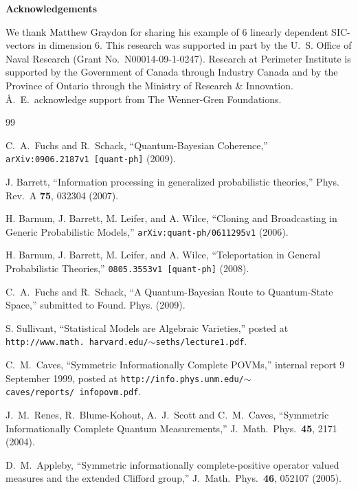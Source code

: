 \documentclass[letterpaper,11pt]{article}
\begin{document}
\begin{center}
 \textbf{Acknowledgements}
\end{center}

We thank Matthew Graydon for sharing his example of 6 linearly dependent SIC-vectors in dimension 6. This research was supported in part by the U.~S. Office of Naval Research (Grant No.~N00014-09-1-0247). Research at Perimeter Institute is supported by the Government of Canada through Industry Canada and by the Province of Ontario through the Ministry of Research \& Innovation. \AA.~E.~acknowledge support from The Wenner-Gren Foundations.



\vspace{12pt}
\begin{thebibliography}{99}
\itemsep -1pt
\small

C.~A.~Fuchs and R.~Schack, ``Quantum-Bayesian Coherence,''  {\tt arXiv:0906.2187v1 [quant-ph]} (2009).

J. Barrett, ``Information processing in generalized probabilistic theories,''
Phys. Rev.~A {\bf 75}, 032304 (2007).

H. Barnum, J. Barrett, M. Leifer, and A. Wilce, ``Cloning and Broadcasting in Generic Probabilistic Models,'' {\tt 	 arXiv:quant-ph/0611295v1} (2006).

H. Barnum, J. Barrett, M. Leifer, and A. Wilce, ``Teleportation in General Probabilistic Theories,''
{\tt 0805.3553v1 [quant-ph]} (2008).

C.~A.~Fuchs and R.~Schack, ``A Quantum-Bayesian Route to Quantum-State Space,''  submitted to Found. Phys. (2009).

S. Sullivant, ``Statistical Models are Algebraic Varieties,'' posted at {\tt http://www.math. harvard.edu/$\sim$seths/lecture1.pdf}.

C.~M.~Caves, ``Symmetric Informationally Complete POVMs,'' internal report 9 September 1999, posted at
{\tt http://info.phys.unm.edu/$\sim$caves/reports/\ \hspace{-1.2ex}infopovm.pdf}.

J.~M.~Renes, R.~Blume-Kohout, A.~J.~Scott and C.~M.~Caves, ``Symmetric Informationally Complete Quantum Measurements,'' J.~Math.\ Phys.\ {\bf 45}, 2171 (2004).

D.~M.~Appleby, ``Symmetric informationally complete-positive operator valued measures and the extended Clifford group,'' J.~Math.\ Phys.\ {\bf 46}, 052107 (2005).


\end{thebibliography}
\end{document}
